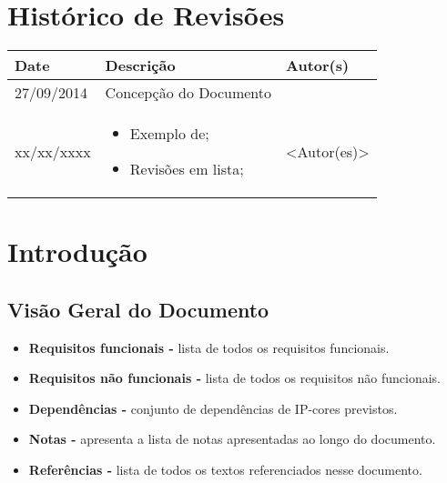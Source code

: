 \documentclass{article}
\begin{document}

\capa
\newpage

\section*{\center Histórico de Revisões}
  \vspace*{1cm}
  \begin{table}[ht]
    \centering
    \begin{tabular}[pos]{|m{2cm} | m{7.2cm} | m{3.8cm}|} 
      \hline
      \cellcolor[gray]{0.9}
      \textbf{Date} & \cellcolor[gray]{0.9}\textbf{Descrição} & \cellcolor[gray]{0.9}\textbf{Autor(s)}\\ \hline
      \hline
      \small 27/09/2014 & \small Concepção do Documento &  \\ \hline      
      \small xx/xx/xxxx &
      \begin{small}
        \begin{itemize}
          \item Exemplo de;
          \item Revisões em lista;
        \end{itemize}
      \end{small} & \small <Autor(es)> \\ \hline 
    \end{tabular}
  \end{table}

\newpage

\tableofcontents
\newpage

\section{Introdução}

\subsection{Visão Geral do Documento}
  \begin{itemize}
   \item \textbf{Requisitos funcionais -} lista de todos os requisitos funcionais.
   \item \textbf{Requisitos não funcionais -} lista de todos os requisitos não funcionais.
   \item \textbf{Dependências -} conjunto de dependências de IP-cores previstos.
   \item \textbf{Notas -} apresenta a lista de notas apresentadas ao longo do documento.
   \item \textbf{Referências -} lista de todos os textos referenciados nesse documento.
  \end{itemize}
\end{document}
